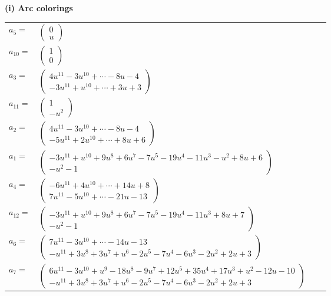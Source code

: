 \documentclass[1p]{elsarticle_modified}
\theoremstyle{definition}
\begin{document}
\flushleft \textbf{(i) Arc colorings}\\
\begin{tabular}{m{7pt} m{180pt} m{7pt} m{180pt} }
\flushright $a_{5}=$&$\begin{pmatrix}0\\u\end{pmatrix}$ \\
\flushright $a_{10}=$&$\begin{pmatrix}1\\0\end{pmatrix}$ \\
\flushright $a_{3}=$&$\begin{pmatrix}4 u^{11}-3 u^{10}+\cdots-8 u-4\\-3 u^{11}+u^{10}+\cdots+3 u+3\end{pmatrix}$ \\
\flushright $a_{11}=$&$\begin{pmatrix}1\\- u^2\end{pmatrix}$ \\
\flushright $a_{2}=$&$\begin{pmatrix}4 u^{11}-3 u^{10}+\cdots-8 u-4\\-5 u^{11}+2 u^{10}+\cdots+8 u+6\end{pmatrix}$ \\
\flushright $a_{1}=$&$\begin{pmatrix}-3 u^{11}+u^{10}+9 u^8+6 u^7-7 u^5-19 u^4-11 u^3- u^2+8 u+6\\- u^2-1\end{pmatrix}$ \\
\flushright $a_{4}=$&$\begin{pmatrix}-6 u^{11}+4 u^{10}+\cdots+14 u+8\\7 u^{11}-5 u^{10}+\cdots-21 u-13\end{pmatrix}$ \\
\flushright $a_{12}=$&$\begin{pmatrix}-3 u^{11}+u^{10}+9 u^8+6 u^7-7 u^5-19 u^4-11 u^3+8 u+7\\- u^2-1\end{pmatrix}$ \\
\flushright $a_{6}=$&$\begin{pmatrix}7 u^{11}-3 u^{10}+\cdots-14 u-13\\- u^{11}+3 u^8+3 u^7+u^6-2 u^5-7 u^4-6 u^3-2 u^2+2 u+3\end{pmatrix}$ \\
\flushright $a_{7}=$&$\begin{pmatrix}6 u^{11}-3 u^{10}+u^9-18 u^8-9 u^7+12 u^5+35 u^4+17 u^3+u^2-12 u-10\\- u^{11}+3 u^8+3 u^7+u^6-2 u^5-7 u^4-6 u^3-2 u^2+2 u+3\end{pmatrix}$ \\

\end{tabular}
\end{document}
